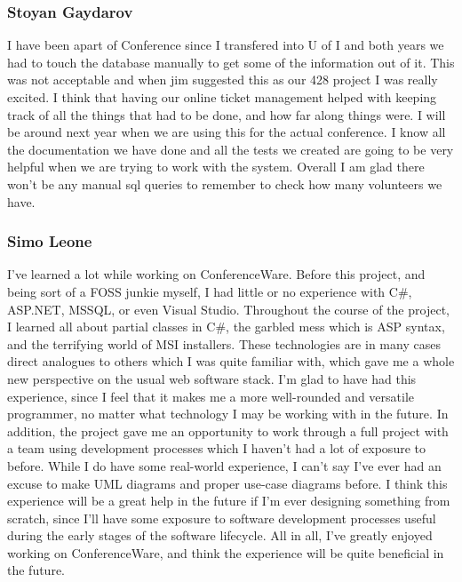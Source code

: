 \documentclass[12pt]{article}
\begin{document}
\subsubsection{Stoyan Gaydarov}
I have been apart of Conference since I transfered into U of I and both years
we had to touch the database manually to get some of the information out of it.
This was not acceptable and when jim suggested this as our 428 project I was
really excited. I think that having our online ticket management helped with
keeping track of all the things that had to be done, and how far along things were.
I will be around next year when we are using this for the actual conference. I know
all the documentation we have done and all the tests we created are going to be
very helpful when we are trying to work with the system. Overall I am glad there
won't be any manual sql queries to remember to check how many volunteers we have.
\subsubsection{Simo Leone}
I've learned a lot while working on ConferenceWare. Before this project, and
being sort of a FOSS junkie myself, I had little or no experience with
C\#, ASP.NET, MSSQL, or even Visual Studio. Throughout the course of the project,
I learned all about partial classes in C\#, the garbled mess which is ASP syntax,
and the terrifying world of MSI installers. These technologies are in many cases
direct analogues to others which I was quite familiar with, which gave me a
whole new perspective on the usual web software stack. I'm glad to have had this
experience, since I feel that it makes me a more well-rounded and versatile
programmer, no matter what technology I may be working with in the future. In
addition, the project gave me an opportunity to work through a full project
with a team using development processes which I haven't had a lot of exposure
to before. While I do have some real-world experience, I can't say I've ever
had an excuse to make UML diagrams and proper use-case diagrams before. I
think this experience will be a great help in the future if I'm ever designing
something from scratch, since I'll have some exposure to software development
processes useful during the early stages of the software lifecycle. All in all,
I've greatly enjoyed working on ConferenceWare, and think the experience will
be quite beneficial in the future.
\end{document}
